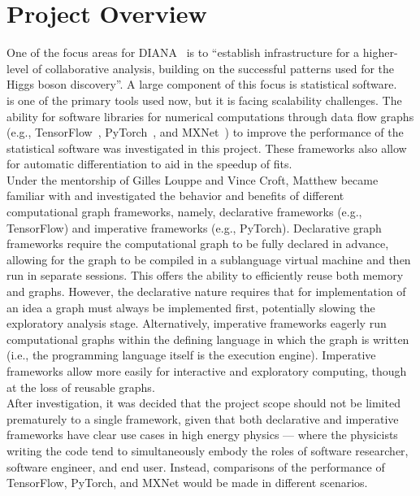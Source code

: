 \section{Project Overview}

One of the focus areas for DIANA~\cite{DIANA-proposal-2014} is to ``establish infrastructure for a higher-level of collaborative analysis, building on the successful patterns used for the Higgs boson discovery''.
A large component of this focus is statistical software.
~\cite{Verkerke:2003ir} is one of the primary tools used now, but it is facing scalability challenges.
The ability for software libraries for numerical computations through data flow graphs (e.g., TensorFlow~\cite{tensorflow2015-whitepaper}, PyTorch~\cite{paszke2017automatic}, and MXNet~\cite{DBLP:journals/corr/ChenLLLWWXXZZ15}) to improve the performance of the statistical software was investigated in this project.
These frameworks also allow for automatic differentiation to aid in the speedup of fits.\\

Under the mentorship of Gilles Louppe and Vince Croft, Matthew became familiar with and investigated the behavior and benefits of different computational graph frameworks, namely, declarative frameworks (e.g., TensorFlow) and imperative frameworks (e.g., PyTorch).
Declarative graph frameworks require the computational graph to be fully declared in advance, allowing for the graph to be compiled in a sublanguage virtual machine and then run in separate sessions.
This offers the ability to efficiently reuse both memory and graphs.
However, the declarative nature requires that for implementation of an idea a graph must always be implemented first, potentially slowing the exploratory analysis stage.
Alternatively, imperative frameworks eagerly run computational graphs within the defining language in which the graph is written (i.e., the programming language itself is the execution engine).
Imperative frameworks allow more easily for interactive and exploratory computing, though at the loss of reusable graphs.~\cite{Chintala:2302087}\\

After investigation, it was decided that the project scope should not be limited prematurely to a single framework, given that both declarative and imperative frameworks have clear use cases in high energy physics --- where the physicists writing the code tend to simultaneously embody the roles of software researcher, software engineer, and end user.
Instead, comparisons of the performance of TensorFlow, PyTorch, and MXNet would be made in different scenarios.\\

